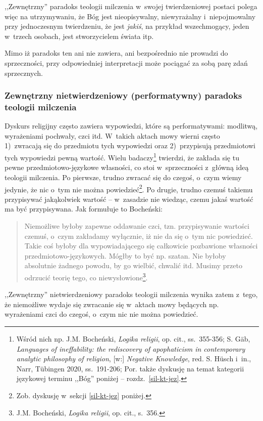 ,,Zewnętrzny'' paradoks teologii milczenia w~swojej twierdzeniowej postaci polega więc na utrzymywaniu, że Bóg jest nieopisywalny, niewyrażalny i~niepojmowalny przy jednoczesnym twierdzeniu, że jest \textit{jakiś}, na przykład wszechmogący, jeden w~trzech osobach, jest stworzycielem świata itp.

Mimo iż paradoks ten ani nie zawiera, ani bezpośrednio nie prowadzi do sprzeczności, przy odpowiedniej interpretacji może pociągać za sobą parę zdań sprzecznych.


\subsubsection{Zewnętrzny nietwierdzeniowy (performatywny) paradoks teologii milczenia}

Dyskurs religijny często zawiera wypowiedzi, które są performatywami: modlitwą, wyrażeniami pochwały, czci itd. W~takich aktach mowy wierni często 1)~zwracają się do przedmiotu tych wypowiedzi oraz 2)~przypisują przedmiotowi tych wypowiedzi pewną wartość. Wielu badaczy\footnote{Wśród nich np. J.M. Bocheński, \textit{Logika religii}, op. cit., ss.~355-356; S. Gäb, \textit{Languages of ineffability: the rediscovery of apophaticism in contemporary analytic philosophy of religion}, [w:] \textit{Negative Knowledge}, red. S. Hüsch i~in., Narr, Tübingen 2020, ss.~191-206; Por. także dyskusję na temat kategorii językowej terminu ,,Bóg'' poniżej -- rozdz.~\ref{sil-kt-jez}.} twierdzi, że zakłada się tu pewne przedmiotowo-językowe własności, co stoi w~sprzeczności z~główną ideą teologii milczenia. Po pierwsze, trudno zwracać się do czegoś, o~czym wiemy jedynie, że nic o~tym nie można powiedzieć\footnote{Zob. dyskusję w~sekcji \ref{sil-kt-jez} poniżej.}. Po drugie, trudno czemuś takiemu przypisywać jakąkolwiek wartość -- w~zasadzie nie wiedząc, czemu jakaś wartość ma być przypisywana. Jak formułuje to Bocheński:

\begin{quote}
Niemożliwe byłoby zapewne oddawanie czci, tzn. przypisywanie wartości czemuś, o~czym zakładamy wyłącznie, iż nie da się o~tym nic powiedzieć. Takie coś byłoby dla wypowiadającego się całkowicie pozbawione własności przedmiotowo-językowych. Mógłby to być np. szatan. Nie byłoby absolutnie żadnego powodu, by go wielbić, chwalić itd. Musimy przeto odrzucić teorię tego, co niewysłowione\footnote{J.M. Bocheński, \textit{Logika religii}, op. cit., s.~356.}.
\end{quote}
,,Zewnętrzny'' nietwierdzeniowy paradoks teologii milczenia wynika zatem z~tego, że niemożliwe wydaje się zwracanie się w~aktach mowy będących np. wyrażeniami czci do czegoś, o~czym nic nie można powiedzieć.

